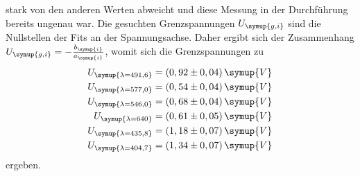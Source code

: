 stark von den anderen Werten abweicht und diese Messung in der Durchführung bereits ungenau war.
Die gesuchten Grenzspannungen $U_{\symup{g, i}}$ sind die Nullstellen der Fits an der Spannungsachse. Daher ergibt sich der Zusammenhang
$U_{\symup{g, i}} = - \frac{b_{\symup{i}}}{a_{\symup{i}}}$, womit sich die Grenzspannungen zu 
\begin{align*}
  U_{\symup{\lambda = 491,6}} &= (0,92 \pm 0,04) \, \symup{V} \\
  U_{\symup{\lambda = 577,0}} &= (0,54 \pm 0,04) \, \symup{V} \\
  U_{\symup{\lambda = 546,0}} &= (0,68 \pm 0,04) \, \symup{V} \\
  U_{\symup{\lambda =640}} &= (0,61 \pm 0,05) \, \symup{V} \\
  U_{\symup{\lambda = 435,8}} &= (1,18 \pm 0,07) \, \symup{V} \\
  U_{\symup{\lambda = 404,7}} &= (1,34 \pm 0,07) \, \symup{V} \\
\end{align*}
ergeben.


